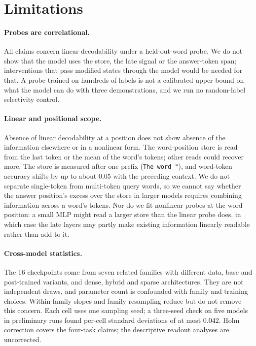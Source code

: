 \section{Limitations}
\label{sec:limitations}

\paragraph{Probes are correlational.}
All claims concern linear decodability under a held-out-word probe. We do not show that the model
uses the store, the late signal or the answer-token span; interventions that pass modified states
through the model would be needed for that. A probe trained on hundreds of labels is not a calibrated
upper bound on what the model can do with three demonstrations, and we run no random-label
selectivity control.

\paragraph{Linear and positional scope.}
Absence of linear decodability at a position does not show absence of the information elsewhere or in
a nonlinear form. The word-position store is read from the last token or the mean of the word's
tokens; other reads could recover more. The store is measured after one prefix
(\texttt{The word "}), and word-token accuracy shifts by up to about 0.05 with the preceding context.
We do not separate single-token from multi-token query words, so we cannot say whether the answer
position's excess over the store in larger models requires combining information across a word's
tokens. Nor do we fit nonlinear probes at the word position: a small MLP might read a larger store
than the linear probe does, in which case the late layers may partly make existing information
linearly readable rather than add to it.

\paragraph{Cross-model statistics.}
The 16 checkpoints come from seven related families with different data, base and post-trained
variants, and dense, hybrid and sparse architectures. They are not independent draws, and parameter
count is confounded with family and training choices. Within-family slopes and family resampling
reduce but do not remove this concern. Each cell uses one sampling seed; a three-seed check on five
models in preliminary runs found per-cell standard deviations of at most 0.042. Holm correction
covers the four-task claims; the descriptive readout analyses are uncorrected.

